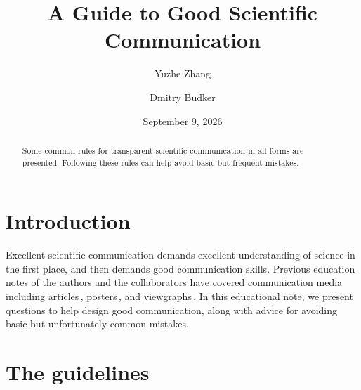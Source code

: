 \documentclass[%
reprint,
superscriptaddress,
nofootinbib,
 aps,
floatfix,
]{revtex4-2}
\begin{document}
\title{A Guide to Good Scientific Communication}

\author{Yuzhe Zhang}


\author{Dmitry Budker}


\date{September 9, 2026}

\begin{abstract}
    Some common rules for transparent scientific communication in all forms are presented. Following these rules can help avoid basic but frequent mistakes.
\end{abstract}


\maketitle

\section{Introduction}

Excellent scientific communication demands excellent understanding of science in the first place, and then demands good communication skills.
Previous education notes of the authors and the collaborators have covered communication media including articles\,\cite{Budker2008writing, Budker_Kimball_2016_collaborative}, posters\,\cite{Budker_Trabesinger_2017_Poster}, and viewgraphs\,\cite{Zhang_Budker_2024_viewgraphs}.
In this educational note, we present questions to help design good communication, along with advice for avoiding basic but unfortunately common mistakes.

\vspace{0.3\baselineskip}
\section{The guidelines}
\end{document}
